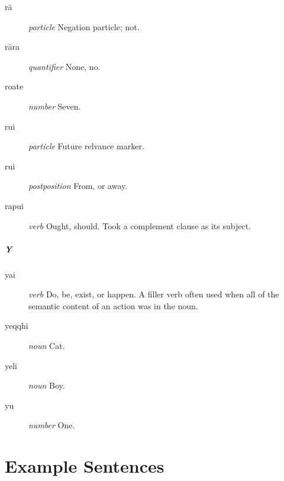 \documentclass{article}
\begin{document}
\begin{description}
\item [r\"a] \emph{particle} Negation particle; not.
\item [r\"ara] \emph{quantifier} None, no.
\item [roate] \emph{number} Seven.
\item [rui] \emph{particle} Future relvance marker.
\item [rui] \emph{postposition} From, or away.
\item [rapui] \emph{verb} Ought, should. Took a complement clause as its subject.
\end{description}

\subsubsection{Y}

\begin{description}
\item [yai] \emph{verb} Do, be, exist, or happen.  A filler verb often used when all of the semantic content of an action was in the noun.
\item [yeqqhi] \emph{noun} Cat.
\item [yeli] \emph{noun} Boy.
\item [yu] \emph{number} One.
\end{description}

\part{Example Sentences}
\end{document}
